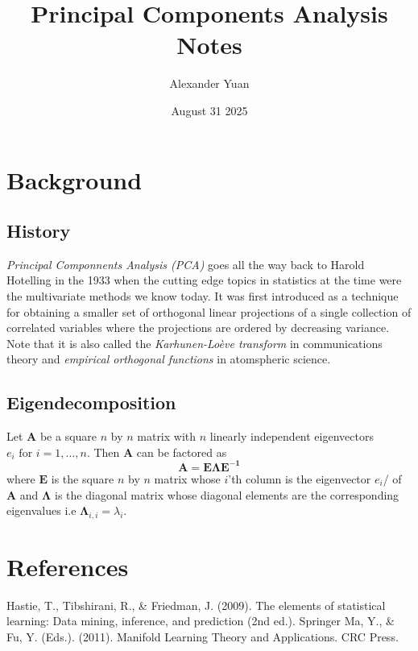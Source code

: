 \documentclass{article}
\title{Principal Components Analysis Notes}
\author{Alexander Yuan}
\date{August 31 2025}
\begin{document}
 
\maketitle

\section{Background}
\subsection{History}
\emph{Principal Componnents Analysis (PCA)} goes all the way back to Harold Hotelling in the 1933 when the cutting edge topics in statistics at the time were the multivariate methods we know today. It was first 
introduced as a technique for obtaining a smaller set of orthogonal linear projections of a single collection of correlated variables where the projections are ordered by decreasing variance. Note that it is also
called the \emph{Karhunen-Loève transform} in communications theory and \emph{empirical orthogonal functions} in atomspheric science.

\subsection{Eigendecomposition}
Let $\mathbf{A}$ be a square $n$ by $n$ matrix with $n$ linearly independent eigenvectors $e_i \text{ for } i = 1, \ldots , n$. Then $\mathbf{A}$ can be factored as 
$$
\mathbf{A = E \Lambda E^{-1}}
$$
where $\mathbf{E}$ is the square $n$ by $n$ matrix whose $i$'th column is the eigenvector $e_i$/ of $\mathbf{A}$ and $\mathbf{\Lambda}$ is the diagonal matrix whose diagonal elements are the corresponding eigenvalues 
i.e $\mathbf{\Lambda}_{i,i}= \lambda_i$.


\section{References}
Hastie, T., Tibshirani, R., & Friedman, J. (2009). The elements of statistical learning: Data mining, inference, and prediction (2nd ed.). Springer \newline \newline 
Ma, Y., \& Fu, Y. (Eds.). (2011). Manifold Learning Theory and Applications. CRC Press.
\end{document}
